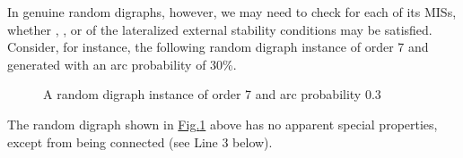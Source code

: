 \documentclass[a4paper,12pt,english]{sphinxhowto}
\let\sphinxpxdimen\pdfpxdimen\else\newdimen\sphinxpxdimen
\begin{document}
\sphinxAtStartPar
In genuine random digraphs, however, we may need to check for each of its MISs, whether , , or  of the lateralized external stability conditions may be satisfied. Consider, for instance, the following random digraph instance of order 7 and generated with an arc probability of 30\%.

\begin{sphinxVerbatim}[commandchars=\\\{\},numbers=left,firstnumber=1,stepnumber=1]
 
  
\end{sphinxVerbatim}

\begin{figure}[H]
\centering
\capstart

\noindent\sphinxincludegraphics[width=300\sphinxpxdimen]{{randomLaterality}.png}
\caption{A random digraph instance of order 7 and arc probability 0.3}\label{\detokenize{pearls:randomlaterality}}\end{figure}

\sphinxAtStartPar
The random digraph shown in \hyperref[\detokenize{pearls:randomlaterality}]{Fig.\@ \ref{\detokenize{pearls:randomlaterality}}} above has no apparent special properties, except from being connected (see Line 3 below).
\end{document}
